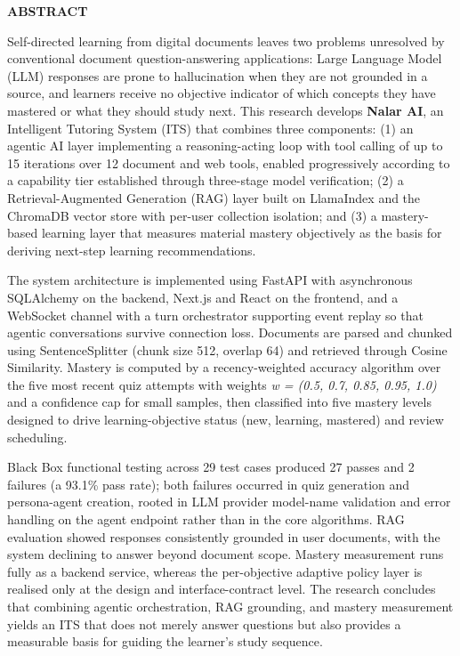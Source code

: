 \documentclass[12pt,a4paper]{article}
\begin{document}
\textbf{ABSTRACT}



Self-directed learning from digital documents leaves two problems unresolved by conventional document question-answering applications: Large Language Model (LLM) responses are prone to hallucination when they are not grounded in a source, and learners receive no objective indicator of which concepts they have mastered or what they should study next. This research develops \textbf{Nalar AI}, an Intelligent Tutoring System (ITS) that combines three components: (1) an agentic AI layer implementing a reasoning-acting loop with tool calling of up to 15 iterations over 12 document and web tools, enabled progressively according to a capability tier established through three-stage model verification; (2) a Retrieval-Augmented Generation (RAG) layer built on LlamaIndex and the ChromaDB vector store with per-user collection isolation; and (3) a mastery-based learning layer that measures material mastery objectively as the basis for deriving next-step learning recommendations.



The system architecture is implemented using FastAPI with asynchronous SQLAlchemy on the backend, Next.js and React on the frontend, and a WebSocket channel with a turn orchestrator supporting event replay so that agentic conversations survive connection loss. Documents are parsed and chunked using SentenceSplitter (chunk size 512, overlap 64) and retrieved through Cosine Similarity. Mastery is computed by a recency-weighted accuracy algorithm over the five most recent quiz attempts with weights \textit{w = (0.5, 0.7, 0.85, 0.95, 1.0)} and a confidence cap for small samples, then classified into five mastery levels designed to drive learning-objective status (new, learning, mastered) and review scheduling.



Black Box functional testing across 29 test cases produced 27 passes and 2 failures (a 93.1\% pass rate); both failures occurred in quiz generation and persona-agent creation, rooted in LLM provider model-name validation and error handling on the agent endpoint rather than in the core algorithms. RAG evaluation showed responses consistently grounded in user documents, with the system declining to answer beyond document scope. Mastery measurement runs fully as a backend service, whereas the per-objective adaptive policy layer is realised only at the design and interface-contract level. The research concludes that combining agentic orchestration, RAG grounding, and mastery measurement yields an ITS that does not merely answer questions but also provides a measurable basis for guiding the learner's study sequence.
\end{document}
